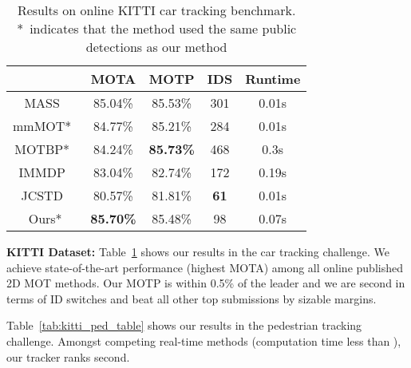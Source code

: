 \documentclass[letterpaper, 10 pt, conference]{ieeeconf}
\begin{document}
\begin{table}[t]
\vspace{0.15cm}
\footnotesize
    \centering
\begin{tabular}{ | c | c | c | c | c |}
\hline
 & MOTA  & MOTP  & IDS  & Runtime \\ 
   \hline\hline
 MASS~\cite{8782450} & 85.04\% & 85.53\% & 301 & 0.01s\\
 \hline
 mmMOT*~\cite{luiten2020track} & 84.77\% & 85.21\% & 284 & 0.01s \\ \hline
MOTBP*~\cite{8461018} & 84.24\% & \bf 85.73\% & 468 & 0.3s \\ \hline
 IMMDP~\cite{Xiang_2015_ICCV} & 83.04\% & 82.74\% & 172 & 0.19s \\ \hline
JCSTD~\cite{8621602} & 80.57\% & 81.81\% & \bf 61 & 0.01s \\
 \hline\hline
 Ours* & \bf 85.70\% & 85.48\% & 98 & 0.07s \\
\hline
\end{tabular}
    \caption{Results on online KITTI car tracking benchmark. *~indicates that the method used the same public detections as our method}
    \label{tab:kitti_car_table}
    \vspace{-5pt}
\end{table}



\textbf{KITTI Dataset:} Table~\ref{tab:kitti_car_table} shows our results in the car tracking challenge. We achieve state-of-the-art performance (highest MOTA) among all online published 2D MOT methods. 
Our MOTP is within 0.5\% of the leader and we are second in terms of ID switches and beat all other top submissions by sizable margins.

Table~\ref{tab:kitti_ped_table} shows our results in the pedestrian tracking challenge. Amongst competing real-time methods (computation time less than ), our tracker ranks second.
\end{document}
